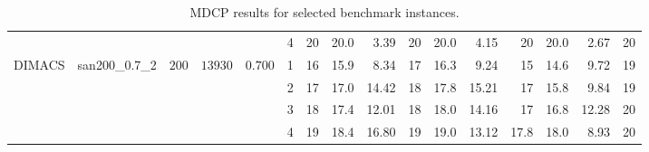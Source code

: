 \documentclass[draft,final]{vutinfth} %
\begin{document}
\begin{table}
{\begin{tabular}{llrrrr | rrr rrr rrr r}
               &          &      &       &         & 4 & 20 & 20.0 & 3.39 & 20 & 20.0 & 4.15 & 20 & 20.0 & 2.67 & 20\\
        DIMACS & san200\_0.7\_2 & $200$ & $13930$ & $0.700$   & 1 & 16 & 15.9 & 8.34 & 17 & 16.3 & 9.24 & 15 & 14.6 & 9.72 & 19\\
               &          &      &       &                    & 2 & 17 & 17.0 & 14.42 & 18 & 17.8 & 15.21 & 17 & 15.8 & 9.84 & 19\\
               &          &      &       &                    & 3 & 18 & 17.4 & 12.01 & 18 & 18.0 & 14.16 & 17 & 16.8 & 12.28 & 20\\
               &          &      &       &                    & 4 & 19 & 18.4 & 16.80 & 19 & 19.0 & 13.12 & 17.8 & 18.0 & 8.93 & 20\\
        
        
    \end{tabular}
    }
    \caption{MDCP results for selected benchmark instances.}
    \label{tab:mdcp-benchmark}
\end{table}
\end{document}
